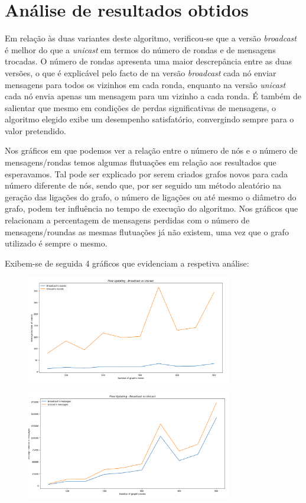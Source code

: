 \documentclass[a4paper]{report}
\begin{document}
{\let\clearpage\relax \chapter{Análise de resultados obtidos} \label{ch:Analysis of results}}
\large{
	Em relação às duas variantes deste algoritmo, verificou-se que a versão \textit{broadcast} é melhor do que a \textit{unicast} em termos do número de rondas e de mensagens trocadas.
	O número de rondas apresenta uma maior descrepância entre as duas versões, o que é explicável pelo facto de na versão \textit{broadcast} cada nó enviar mensagens para todos os vizinhos em cada ronda, 
	enquanto na versão \textit{unicast} cada nó envia apenas um mensagem para um vizinho a cada ronda.	
	É também de salientar que mesmo em condições de perdas significativas de mensagens, o algoritmo elegido exibe um desempenho satisfatório, convergindo sempre para o valor pretendido.

	Nos gráficos em que podemos ver a relação entre o número de nós e o número de mensagens/rondas temos algumas flutuações em relação aos resultados que esperavamos.
	Tal pode ser explicado por serem criados grafos novos para cada número diferente de nós, sendo que, por ser seguido um método aleatório na geração das ligações do grafo, 
	o número de ligações ou até mesmo o diâmetro do grafo, podem ter influência no tempo de execução do algoritmo.
	Nos gráficos que relacionam a percentagem de mensagens perdidas com o número de mensagens/roundas as mesmas flutuações já não existem, uma vez que o grafo utilizado é sempre o mesmo.

	Exibem-se de seguida 4 gráficos que evidenciam a respetiva análise:
	\begin{figure}[H]
		\centering
		\includegraphics[width=0.8\textwidth]{Images/Plot1.png}
		\label{fig:1}
	\end{figure}
	
	\begin{figure}[H]
		\centering
		\includegraphics[width=0.8\textwidth]{Images/Plot2.png}
		\label{fig:2}
	\end{figure}

}
\end{document}

